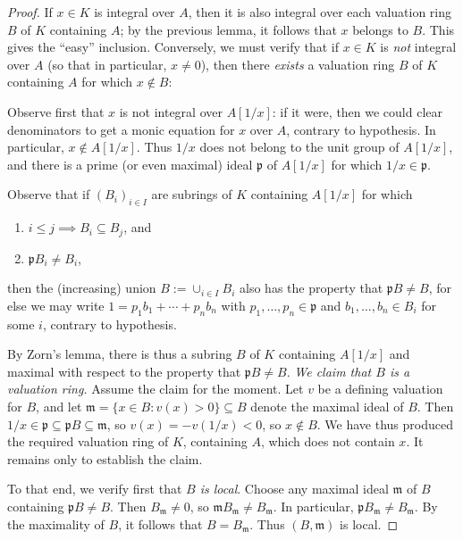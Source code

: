\documentclass[reqno]{amsart}
\begin{document}
\begin{proof}
  If $x \in K$ is integral over $A$,
  then it is also integral over each valuation ring $B$ of $K$
  containing $A$;
  by the previous lemma, it follows that $x$ belongs to $B$.
  This gives the ``easy'' inclusion.
  Conversely,
  we must verify that if $x \in K$ is \emph{not} integral over
  $A$ (so that in particular, $x \neq 0$),
  then there \emph{exists} a valuation ring
  $B$ of $K$ containing $A$ for which $x \notin B$:

  Observe first that $x$ is not integral over $A[1/x]$:
  if it were,
  then we could clear denominators
  to get a monic equation for $x$ over $A$, contrary to
  hypothesis.
  In particular,
  $x \notin A[1/x]$.
  Thus $1/x$ does not belong to the unit group of $A[1/x]$,
  and there is a prime (or even maximal) ideal
  $\mathfrak{p}$ of $A[1/x]$
  for which $1/x \in \mathfrak{p}$.

  Observe that if $(B_i)_{i \in I}$
  are subrings of $K$ containing $A[1/x]$
  for which
  \begin{enumerate}
  \item $i \leq j \implies B_i \subseteq B_j$, and
  \item $\mathfrak{p} B_i \neq B_i$,
  \end{enumerate}
  then the (increasing) union $B := \cup_{i \in I} B_i$
  also has the property that $\mathfrak{p} B \neq B$,
  for else
  we may write $1 = p_1 b_1 + \dotsb + p_n b_n$
  with $p_1,\dotsc,p_n \in \mathfrak{p}$
  and $b_1,\dotsc,b_n \in B_i$ for some $i$,
  contrary to hypothesis.

  By Zorn's lemma, there is thus a subring $B$ of $K$ containing
  $A[1/x]$ and maximal with respect to the property that
  $\mathfrak{p} B \neq B$.
  \emph{We claim that $B$ is a valuation ring.}
  Assume the claim for the moment.
  Let $v$ be a defining valuation for $B$,
  and
  let $\mathfrak{m} = \{x \in B : v(x) > 0\} \subseteq B$ denote the maximal ideal of
  $B$.
  Then $1/x \in \mathfrak{p} \subseteq \mathfrak{p} B \subseteq
  \mathfrak{m}$,
  so $v(x) = - v(1/x) < 0$,
  so $x \notin B$.
  We have thus produced the required valuation ring
  of $K$, containing $A$,
  which does not contain $x$.
  It remains only to establish the claim.

  To that end, we verify first that \emph{$B$ is local}.
  Choose any maximal ideal $\mathfrak{m}$ of $B$
  containing $\mathfrak{p} B \neq B$.
  Then $B_\mathfrak{m} \neq 0$,
  so
  $\mathfrak{m} B_\mathfrak{m} \neq B_\mathfrak{m}$.
  In particular,
  $\mathfrak{p} B_\mathfrak{m} \neq B_\mathfrak{m}$.
  By the maximality of $B$,
  it follows that $B = B_\mathfrak{m}$.
  Thus $(B,\mathfrak{m})$ is local.


\end{proof}
\end{document}
